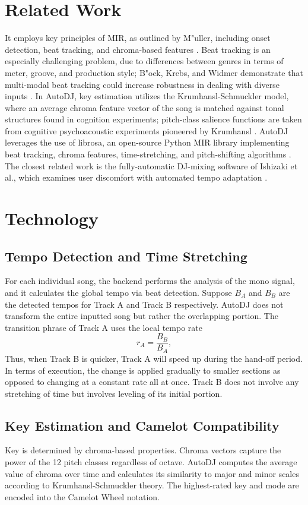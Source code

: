 \documentclass[11pt]{article}
\begin{document}
    \section{Related Work}
    It employs key principles of MIR, as outlined by M{"u}ller, including onset detection, beat tracking, and chroma-based features \cite{muller2015fundamentals}. Beat tracking is an especially challenging problem, due to differences between genres in terms of meter, groove, and production style; B{"o}ck, Krebs, and Widmer demonstrate that multi-modal beat tracking could increase robustness in dealing with diverse inputs \cite{bock2014multi}. In AutoDJ, key estimation utilizes the Krumhansl-Schmuckler model, where an average chroma feature vector of the song is matched against tonal structures found in cognition experiments; pitch-class salience functions are taken from cognitive psychoacoustic experiments pioneered by Krumhansl \cite{krumhansl1990cognitive}. AutoDJ leverages the use of librosa, an open-source Python MIR library implementing beat tracking, chroma features, time-stretching, and pitch-shifting algorithms \cite{mcfee2015librosa}. The closest related work is the fully-automatic DJ-mixing software of Ishizaki et al., which examines user discomfort with automated tempo adaptation \cite{ishizaki2009automatic}.

    \section{Technology}
    \subsection{Tempo Detection and Time Stretching}
    For each individual song, the backend performs the analysis of the mono signal, and it calculates the global tempo via beat detection. Suppose \(B_A\) and \(B_B\) are the detected tempos for Track A and Track B respectively. AutoDJ does not transform the entire inputted song but rather the overlapping portion. The transition phrase of Track A uses the local tempo rate
    \[
        r_A = \frac{B_B}{B_A},
    \]
    Thus, when Track B is quicker, Track A will speed up during the hand-off period. In terms of execution, the change is applied gradually to smaller sections as opposed to changing at a constant rate all at once. Track B does not involve any stretching of time but involves leveling of its initial portion.

    \subsection{Key Estimation and Camelot Compatibility}
    Key is determined by chroma-based properties. Chroma vectors capture the power of the 12 pitch classes regardless of octave. AutoDJ computes the average value of chroma over time and calculates its similarity to major and minor scales according to Krumhansl-Schmuckler theory. The highest-rated key and mode are encoded into the Camelot Wheel notation.
\end{document}
